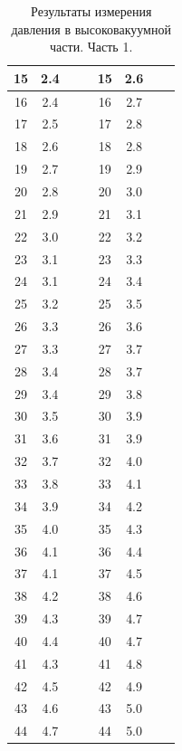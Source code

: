\documentclass[a4paper,12pt]{article}
\begin{document}
\begin{table}[!ht]
{\begin{tabular}{|c|c||c|c||c|c||c|c|}
        15 & 2.4 &    &      & 15 & 2.6 &    &      \\ \hline
        16 & 2.4 &    &      & 16 & 2.7 &    &      \\ \hline
        17 & 2.5 &    &      & 17 & 2.8 &    &      \\ \hline
        18 & 2.6 &    &      & 18 & 2.8 &    &      \\ \hline
        19 & 2.7 &    &      & 19 & 2.9 &    &      \\ \hline
        20 & 2.8 &    &      & 20 & 3.0 &    &      \\ \hline
        21 & 2.9 &    &      & 21 & 3.1 &    &      \\ \hline
        22 & 3.0 &    &      & 22 & 3.2 &    &      \\ \hline
        23 & 3.1 &    &      & 23 & 3.3 &    &      \\ \hline
        24 & 3.1 &    &      & 24 & 3.4 &    &      \\ \hline
        25 & 3.2 &    &      & 25 & 3.5 &    &      \\ \hline
        26 & 3.3 &    &      & 26 & 3.6 &    &      \\ \hline
        27 & 3.3 &    &      & 27 & 3.7 &    &      \\ \hline
        28 & 3.4 &    &      & 28 & 3.7 &    &      \\ \hline
        29 & 3.4 &    &      & 29 & 3.8 &    &      \\ \hline
        30 & 3.5 &    &      & 30 & 3.9 &    &      \\ \hline
        31 & 3.6 &    &      & 31 & 3.9 &    &      \\ \hline
        32 & 3.7 &    &      & 32 & 4.0 &    &      \\ \hline
        33 & 3.8 &    &      & 33 & 4.1 &    &      \\ \hline
        34 & 3.9 &    &      & 34 & 4.2 &    &      \\ \hline
        35 & 4.0 &    &      & 35 & 4.3 &    &      \\ \hline
        36 & 4.1 &    &      & 36 & 4.4 &    &      \\ \hline
        37 & 4.1 &    &      & 37 & 4.5 &    &      \\ \hline
        38 & 4.2 &    &      & 38 & 4.6 &    &      \\ \hline
        39 & 4.3 &    &      & 39 & 4.7 &    &      \\ \hline
        40 & 4.4 &    &      & 40 & 4.7 &    &      \\ \hline
        41 & 4.3 &    &      & 41 & 4.8 &    &      \\ \hline
        42 & 4.5 &    &      & 42 & 4.9 &    &      \\ \hline
        43 & 4.6 &    &      & 43 & 5.0 &    &      \\ \hline
        44 & 4.7 &    &      & 44 & 5.0 &    &      \\ \hline
    \end{tabular}}
    \caption{Результаты измерения давления в высоковакуумной части. Часть 1.}
\end{table}
\end{document}
